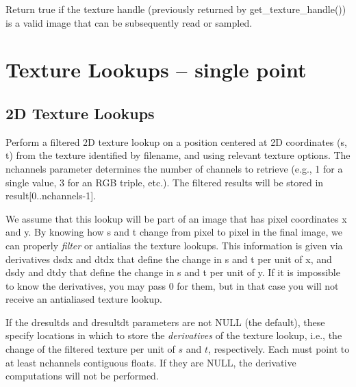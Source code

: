 Return true if the texture handle (previously returned by
{\cf get_texture_handle()}) is a valid image that can be subsequently read
or sampled.
\apiend


\newpage
\section{Texture Lookups -- single point}

\subsection{2D Texture Lookups}
\label{sec:texturesys:api:texture}


Perform a filtered 2D texture lookup on a position centered at 2D
coordinates ({\cf s}, {\cf t}) from the texture identified by
{\cf filename}, and using relevant texture {\cf options}.  The
{\cf nchannels} parameter determines the number of channels to retrieve
(e.g., 1 for a single value, 3 for an RGB triple, etc.).
The filtered results will be stored in {\cf result[0..nchannels-1]}.

We assume that this lookup will be part of an image that has pixel
coordinates {\cf x} and {\cf y}.  By knowing how {\cf s} and {\cf t}
change from pixel to pixel in the final image, we can properly
\emph{filter} or antialias the texture lookups.  This information is
given via derivatives {\cf dsdx} and {\cf dtdx} that define the change
in {\cf s} and {\cf t} per unit of {\cf x}, and {\cf dsdy} and {\cf
  dtdy} that define the change in {\cf s} and {\cf t} per unit of {\cf
  y}.  If it is impossible to know the derivatives, you may pass 0 for
them, but in that case you will not receive an antialiased texture lookup.

If the {\cf dresultds} and {\cf dresultdt} parameters are not {\cf NULL}
(the default), these specify locations in which to store the
\emph{derivatives} of the texture lookup, i.e., the change of the filtered
texture per unit of $s$ and $t$, respectively.  Each must point to at least
{\cf nchannels} contiguous floats.  If they are {\cf NULL}, the derivative
computations will not be performed.

